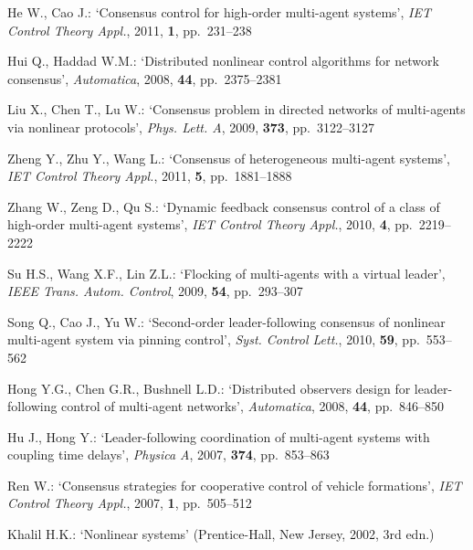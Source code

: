 \documentclass{cta-author}
\begin{document}
\begin{thebibliography}{99}
He W., Cao J.: `Consensus control for high-order multi-agent
systems', \textit{IET Control Theory Appl.}, 2011, \textbf{1}, pp.~231--238

Hui Q., Haddad W.M.: `Distributed nonlinear control algorithms
for network consensus', \textit{Automatica}, 2008, \textbf{44}, pp.~2375--2381

Liu X., Chen T., Lu W.: `Consensus problem in directed
networks of multi-agents via nonlinear protocols', \textit{Phys. Lett.
A}, 2009, \textbf{373}, pp.~3122--3127

Zheng Y., Zhu Y., Wang L.: `Consensus of heterogeneous multi-agent systems', \textit{IET Control
Theory Appl.}, 2011, \textbf{5}, pp.~1881--1888

Zhang W., Zeng D., Qu S.: `Dynamic feedback consensus control of a class of high-order multi-agent systems',
\textit{IET Control Theory Appl.}, 2010, \textbf{4}, pp.~2219--2222

Su H.S., Wang X.F., Lin Z.L.: `Flocking of multi-agents with
a virtual leader', \textit{IEEE Trans. Autom. Control}, 2009,
\textbf{54}, pp.~293--307

Song Q., Cao J., Yu W.: `Second-order leader-following
consensus of nonlinear multi-agent system via pinning control', \textit{Syst. Control Lett.}, 2010, \textbf{59}, pp.~553--562

Hong Y.G., Chen G.R., Bushnell L.D.: `Distributed observers
design for leader-following control of multi-agent networks', \textit{Automatica}, 2008, \textbf{44}, pp.~846--850

Hu J., Hong Y.: `Leader-following coordination of multi-agent
systems with coupling time delays', \textit{Physica A}, 2007,
\textbf{374}, pp.~853--863

Ren W.: `Consensus strategies for cooperative control of vehicle
formations', \textit{IET Control Theory Appl.}, 2007, \textbf{1}, pp.~505--512

Khalil H.K.: `Nonlinear systems' (Prentice-Hall, New
Jersey,  2002, 3rd edn.)

\end{thebibliography}
\end{document}
